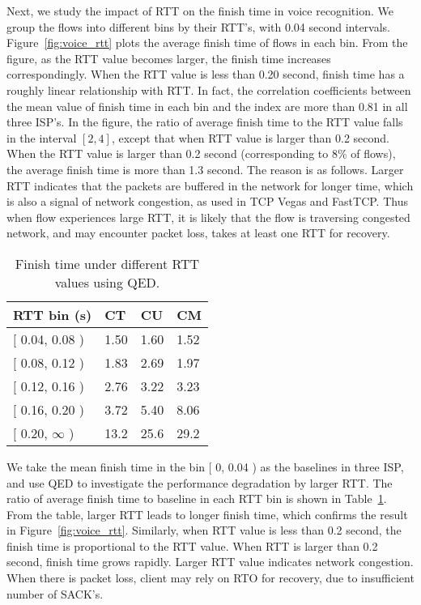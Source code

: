 Next, we study the impact of RTT on the finish time in voice recognition. We group the flows into different bins by their RTT's, with 0.04 second intervals. Figure~\ref{fig:voice_rtt} plots the average finish time of flows in each bin. From the figure, as the RTT value becomes larger, the finish time increases correspondingly. When the RTT value is less than 0.20 second, finish time has a roughly linear relationship with RTT. In fact, the correlation coefficients between the mean value of finish time in each bin and the index are more than 0.81 in all three ISP's. In the figure, the ratio of average finish time to the RTT value falls in the interval $[2, 4]$, except that when RTT value is larger than 0.2 second. When the RTT value is larger than 0.2 second (corresponding to 8\% of flows), the average finish time is more than 1.3 second. The reason is as follows. Larger RTT indicates that the packets are buffered in the network for longer time, which is also a signal of network congestion, as used in TCP Vegas\cite{brakmo1995tcp} and FastTCP\cite{wei2006fast}. Thus when flow experiences large RTT, it is likely that the flow is traversing congested network, and may encounter packet loss, takes at least one RTT for recovery.

\begin{table}[th]
\caption{Finish time under different RTT values using QED.}
\label{tab:voice_qed_rtt}
\centering
\renewcommand{\arraystretch}{1.2}
\begin{tabular}{l|m{.35in}|m{.35in}|m{.35in}}
	\toprule
	RTT bin (s) & CT & CU & CM \\
	\midrule
	$[$ 0.04, 0.08 ) & 1.50 & 1.60 & 1.52 \\
	\hline
	$[$ 0.08, 0.12 ) & 1.83 & 2.69 & 1.97 \\
	\hline
	$[$ 0.12, 0.16 ) & 2.76 & 3.22 & 3.23 \\
	\hline
	$[$ 0.16, 0.20 ) & 3.72 & 5.40 & 8.06 \\
	\hline
	$[$ 0.20, $\infty$ ) & 13.2 & 25.6 & 29.2 \\
	\bottomrule
\end{tabular}
\end{table}

We take the mean finish time in the bin $[$ 0, 0.04 ) as the baselines in three ISP, and use QED to investigate the performance degradation by larger RTT. The ratio of average finish time 
to baseline in each RTT bin is shown in Table~\ref{tab:voice_qed_rtt}. From the table, larger RTT leads to longer finish time, which confirms the result in Figure~\ref{fig:voice_rtt}. Similarly, when RTT value is less than 0.2 second, the finish time is proportional to the RTT value. When RTT is larger than 0.2 second, finish time grows rapidly. Larger RTT value indicates network congestion. When there is packet loss, client may rely on RTO for recovery, due to insufficient number of SACK's.

